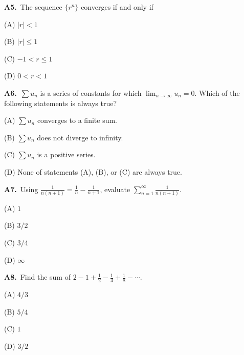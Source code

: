\documentclass[11pt]{article}
\begin{document}
\bigskip\noindent\textbf{A5.}\ The sequence $\{r^n\}$ converges if and only if
\begin{list}{}{\setlength{\leftmargin}{3em}\setlength{\labelwidth}{2.5em}\setlength{\itemsep}{0pt}\setlength{\topsep}{2pt}}
\item[(A)] $|r|<1$
\item[(B)] $|r|\leq 1$
\item[(C)] $-1<r\leq 1$
\item[(D)] $0<r<1$
\end{list}

\bigskip\noindent\textbf{A6.}\ $\displaystyle\sum u_n$ is a series of constants for which $\displaystyle\lim_{n\to\infty} u_n=0$. Which of the following statements is always true?
\begin{list}{}{\setlength{\leftmargin}{3em}\setlength{\labelwidth}{2.5em}\setlength{\itemsep}{0pt}\setlength{\topsep}{2pt}}
\item[(A)] $\displaystyle\sum u_n$ converges to a finite sum.
\item[(B)] $\displaystyle\sum u_n$ does not diverge to infinity.
\item[(C)] $\displaystyle\sum u_n$ is a positive series.
\item[(D)] None of statements (A), (B), or (C) are always true.
\end{list}

\bigskip\noindent\textbf{A7.}\ Using $\frac1{n(n+1)}=\frac1n-\frac1{n+1}$, evaluate $\sum_{n=1}^\infty\frac1{n(n+1)}$.
\begin{list}{}{\setlength{\leftmargin}{3em}\setlength{\labelwidth}{2.5em}\setlength{\itemsep}{0pt}\setlength{\topsep}{2pt}}
\item[(A)] $1$
\item[(B)] $3/2$
\item[(C)] $3/4$
\item[(D)] $\infty$
\end{list}

\bigskip\noindent\textbf{A8.}\ Find the sum of $2-1+\frac12-\frac14+\frac18-\cdots$.
\begin{list}{}{\setlength{\leftmargin}{3em}\setlength{\labelwidth}{2.5em}\setlength{\itemsep}{0pt}\setlength{\topsep}{2pt}}
\item[(A)] $4/3$
\item[(B)] $5/4$
\item[(C)] $1$
\item[(D)] $3/2$
\end{list}
\end{document}
